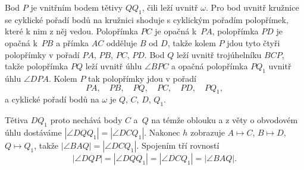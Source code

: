 {    Bod $P$ je vnitřním bodem tětivy $QQ_1$, čili leží uvnitř $\omega$. Pro bod uvnitř kružnice se cyklické pořadí bodů na kružnici shoduje s cyklickým pořadím polopřímek, které k nim z něj vedou. Polopřímka $PC$ je opačná k~$PA$, polopřímka $PD$ je opačná k~$PB$ a přímka $AC$ odděluje $B$ od $D$, takže kolem $P$ jdou tyto čtyři polopřímky v pořadí $PA$, $PB$, $PC$, $PD$. Bod $Q$ leží uvnitř trojúhelníku $BCP$, takže polopřímka $PQ$ leží uvnitř úhlu $\angle BPC$ a opačná polopřímka $PQ_1$ uvnitř úhlu $\angle DPA$. Kolem $P$ tak polopřímky jdou v pořadí
    $$
    PA, \quad PB, \quad PQ, \quad PC, \quad PD, \quad PQ_1,
    $$
    a cyklické pořadí bodů na $\omega$ je $Q$, $C$, $D$, $Q_1$.

    Tětiva $DQ_1$ proto nechává body $C$ a~$Q$ na témže oblouku a z věty o obvodovém úhlu dostáváme $|\angle DQQ_1| = |\angle DCQ_1|$. Nakonec $h$ zobrazuje $A \mapsto C$, $B \mapsto D$, $Q \mapsto Q_1$, takže $|\angle BAQ| = |\angle DCQ_1|$. Spojením tří rovností
    $$
    |\angle DQP| = |\angle DQQ_1| = |\angle DCQ_1| = |\angle BAQ|.
    $$
}

